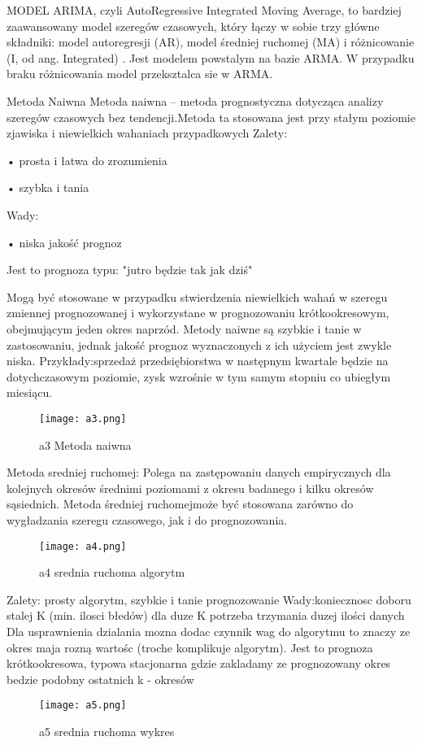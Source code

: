 MODEL ARIMA, czyli AutoRegressive Integrated Moving Average, to bardziej zaawansowany model szeregów czasowych, który łączy w sobie trzy główne składniki: model autoregresji (AR), model średniej ruchomej (MA) i różnicowanie (I, od ang. Integrated) . Jest modelem powstalym na bazie ARMA. W przypadku braku różnicowania model przeksztalca sie w ARMA.\cite{Musz2012}

Metoda Naiwna
 Metoda naiwna – metoda prognostyczna dotycząca analizy szeregów czasowych bez tendencji.Metoda ta stosowana jest przy stałym poziomie zjawiska i niewielkich wahaniach przypadkowych
Zalety: 

    • prosta i łatwa do zrozumienia 
    
    • szybka i tania

Wady:

    • niska jakość prognoz 
    
    Jest to prognoza typu: "jutro będzie tak jak dziś"
 \cite{naiw2023}\cite{Shekh2018} 

Mogą być stosowane w przypadku stwierdzenia niewielkich wahań w szeregu zmiennej prognozowanej i wykorzystane w prognozowaniu krótkookresowym, obejmującym jeden okres naprzód. 
Metody naiwne są szybkie i tanie w zastosowaniu, jednak jakość prognoz wyznaczonych z ich użyciem jest zwykle niska.
Przykłady:sprzedaż przedsiębiorstwa w następnym  kwartale będzie na dotychczasowym poziomie,
zysk wzrośnie w tym samym stopniu co ubiegłym miesiącu.\cite{szer2009}

\begin{figure}[h!]
    \label{fig:a3}
    \centering \texttt{[image: a3.png]}
    \caption{a3 Metoda naiwna\cite{szer2009}}
\end{figure}

Metoda sredniej ruchomej:  Polega na zastępowaniu danych empirycznych dla kolejnych okresów średnimi poziomami z okresu badanego i kilku okresów sąsiednich. Metoda średniej ruchomejmoże być 
stosowana zarówno do wygładzania szeregu czasowego, jak i do prognozowania.
\begin{figure}[h!]
    \label{fig:a4}
    \centering \texttt{[image: a4.png]}
    \caption{a4 srednia ruchoma algorytm\cite{szer2009}}
\end{figure}

Zalety: prosty algorytm, szybkie i tanie prognozowanie
Wady:koniecznosc doboru stalej K (min. ilosci błedów) dla duze K potrzeba trzymania duzej ilości danych
Dla usprawnienia dzialania mozna dodac czynnik wag do algorytmu to znaczy ze okres maja rozną wartośc (troche komplikuje algorytm).
Jest to prognoza krótkookresowa, typowa stacjonarna  gdzie zakladamy ze prognozowany okres bedzie podobny ostatnich k - okresów\cite{szer2009}
\begin{figure}[h!]
    \label{fig:a5}
    \centering \texttt{[image: a5.png]}
    \caption{a5 srednia ruchoma wykres\cite{szer2009}}
\end{figure}



